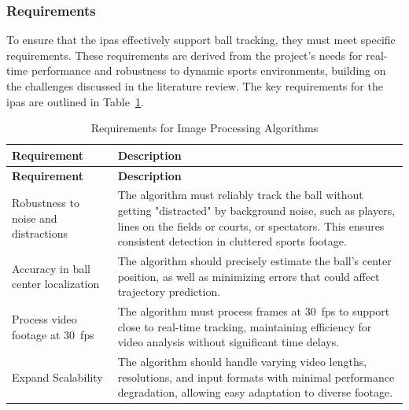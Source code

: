 \documentclass[12pt,a4paper]{article}
\begin{document}
\subsubsection{Requirements}
To ensure that the \acs{ipa}s effectively support ball tracking, they must meet specific requirements. These requirements are derived from the project's needs for real-time performance and robustness to dynamic sports environments, building on the challenges discussed in the literature review. The key requirements for the \acs{ipa}s are outlined in Table~\ref{tab:ipa_requirements}. 

\begin{longtable}{@{} p{} p{} @{}}
    \caption{Requirements for Image Processing Algorithms}
    \label{tab:ipa_requirements} \\
        \toprule
        \textbf{Requirement} & \textbf{Description} \\
        \midrule
        \endfirsthead
        \toprule
        \textbf{Requirement} & \textbf{Description} \\
        \midrule
        \endhead
        \bottomrule
        \endfoot
        \bottomrule
        \endlastfoot
        Robustness to noise and distractions & The algorithm must reliably track the ball without getting "distracted" by background noise, such as players, lines on the fields or courts, or spectators. This ensures consistent detection in cluttered sports footage. \\
        
        Accuracy in ball center localization & The algorithm should precisely estimate the ball's center position, as well as minimizing errors that could affect trajectory prediction. \\
        
        Process video footage at 30~\acs{fps} & The algorithm must process frames at 30~\acs{fps} to support close to real-time tracking, maintaining efficiency for video analysis without significant time delays. \\
        
        Expand Scalability & The algorithm should handle varying video lengths, resolutions, and input formats with minimal performance degradation, allowing easy adaptation to diverse footage. \\
\end{longtable}
\end{document}
